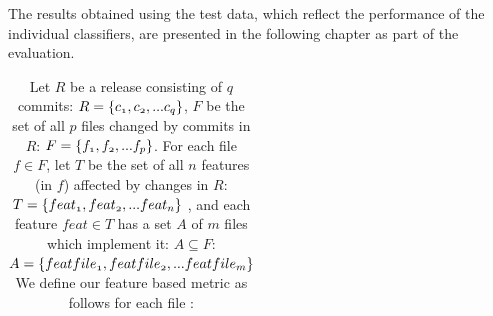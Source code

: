 The results obtained using the test data, which reflect the performance of the individual classifiers, are presented in the following chapter as part of the evaluation.


\setlength{\tymin}{3.5cm}
\begin{table}[!t]
	\fontsize{7}{7}\selectfont
	\centering
	\caption{Let $R$ be a release consisting of $q$ commits: $\mathnormal{R = \{c_{1}, c_{2}, . . . c_{q}}\}$, $F$ be the set of all $p$ files changed by commits in $R$: $\mathnormal{F = \{f_{1}, f_{2}, . . . f_{p}}\}$. For each file $f\in F$, let $T$ be the set of all $n$ features (in $f$) affected by changes in $R$: $\mathnormal{T = \{feat_{1}, feat_{2}, . . . feat_{n}}\}$ , and each feature $feat\in T$ has a set $A$ of $m$ files which implement it: $A\subseteq F$: $\mathnormal{A = \{featfile_{1}, featfile_{2}, . . . featfile_{m}}\}$ We define our feature based metric as follows for each file :}
	\label{tbl:featuredefects}
	\begin{threeparttable}
		\selectfont
		
		\begin{tabulary}{\textwidth}{p{1cm}p{5cm}p{5cm}p{5cm}}
			

\end{tabulary}
\end{threeparttable}
\end{table}
